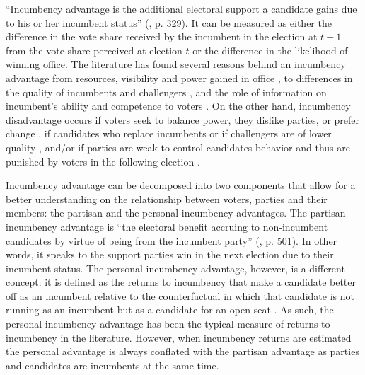 ``Incumbency advantage is the additional electoral support a candidate gains due to his or her incumbent status'' (\citet{cox_morgensten_1993}, p. 329). It can be measured as either the difference in the vote share received by the incumbent in the election at $t+1$ from the vote share perceived at election $t$ or the difference in the likelihood of winning office. The literature has found several reasons behind an incumbency advantage from resources, visibility and power gained in office \citep{mayhew_1974, fiorina_1989, king_1991, cox_morgensten_1993}, to differences in the quality of incumbents and challengers \citep{cox_katz_1996, levitt_wolfram_1997, ansolabehere_snyder_2000, eggers_2017}, and the role of information on incumbent's ability and competence to voters \citep{ashworth_bdm_2008, ashworth_etal_2019}. On the other hand, incumbency disadvantage occurs if voters seek to balance power, they dislike parties, or prefer change  \citep{fowler_hall_2014, eggers_2017}, if candidates who replace incumbents or if challengers are of lower quality \citep{eggers_2017}, and/or if parties are weak to control candidates behavior and thus are punished by voters in the following election \citep{klasnja_titiunik_2017}.


Incumbency advantage can be decomposed into two components that allow for a better understanding on the relationship between voters, parties and their members: the partisan and the personal incumbency advantages. The partisan incumbency advantage is “the electoral benefit accruing to non-incumbent candidates by virtue of being from the incumbent party” (\citet{fowler_hall_2014}, p. 501). In other words, it speaks to the support parties win in the next election due to their incumbent status. The personal incumbency advantage, however, is a different concept: it is defined as the returns to incumbency that make a candidate better off as an incumbent relative to the counterfactual in which that candidate is not running as an incumbent but as a candidate for an open seat \citep{fowler_hall_2014}. As such, the personal incumbency advantage has been the typical measure of returns to incumbency in the literature. However, when incumbency returns are estimated the personal advantage is always conflated with the partisan advantage as parties and candidates are incumbents at the same time. 

